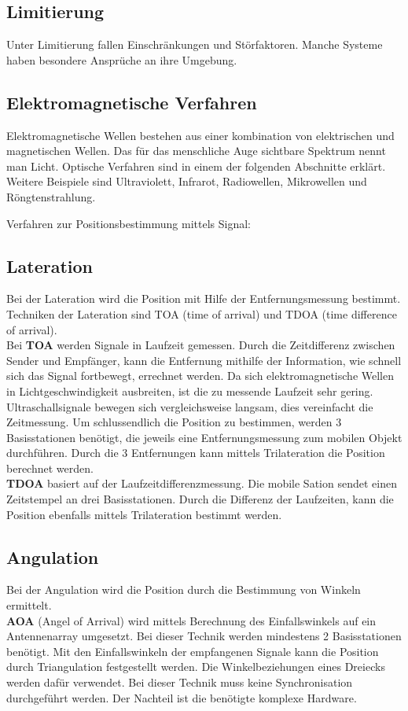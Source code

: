     \subsection*{Limitierung}
    Unter Limitierung fallen Einschränkungen und Störfaktoren. Manche Systeme haben besondere Ansprüche an ihre Umgebung.


    \subsection{Elektromagnetische Verfahren}

    Elektromagnetische Wellen bestehen aus einer kombination von elektrischen und magnetischen Wellen. Das für das menschliche Auge sichtbare Spektrum nennt man Licht. Optische Verfahren sind in einem der folgenden Abschnitte erklärt. Weitere Beispiele sind Ultraviolett, Infrarot, Radiowellen, Mikrowellen und Röngtenstrahlung. 

    Verfahren zur Positionsbestimmung mittels Signal: \cite{pos_signal_2} \cite{pos_signal_4}
    
    \subsection*{Lateration}
    Bei der Lateration wird die Position mit Hilfe der Entfernungsmessung bestimmt.
    Techniken der Lateration sind TOA (time of arrival) und TDOA (time difference of arrival).\\
    Bei \textbf{TOA} werden Signale in Laufzeit gemessen. Durch die Zeitdifferenz zwischen Sender und Empfänger, kann die Entfernung mithilfe der Information, wie schnell sich das Signal fortbewegt, errechnet werden. Da sich elektromagnetische Wellen in Lichtgeschwindigkeit ausbreiten, ist die zu messende Laufzeit sehr gering. Ultraschallsignale bewegen sich vergleichsweise langsam, dies vereinfacht die Zeitmessung. 
    Um schlussendlich die Position zu bestimmen, werden 3 Basisstationen benötigt, die jeweils eine Entfernungsmessung zum mobilen Objekt durchführen. Durch die 3 Entfernungen kann mittels Trilateration die Position berechnet werden.
    \\ %
    \textbf{TDOA} basiert auf der Laufzeitdifferenzmessung. 
    Die mobile Sation sendet einen Zeitstempel an drei Basisstationen. Durch die Differenz der Laufzeiten, kann die Position ebenfalls mittels Trilateration bestimmt werden.
    \\ %
    \subsection*{Angulation}
    Bei der Angulation wird die Position durch die Bestimmung von Winkeln ermittelt. \\
    \textbf{AOA} (Angel of Arrival) wird mittels Berechnung des Einfallswinkels auf ein Antennenarray umgesetzt. Bei dieser Technik werden mindestens 2 Basisstationen benötigt. Mit den Einfallswinkeln der empfangenen Signale kann die Position durch Triangulation festgestellt werden. Die Winkelbeziehungen eines Dreiecks werden dafür verwendet.
    Bei dieser Technik muss keine Synchronisation durchgeführt werden. Der Nachteil ist die benötigte komplexe Hardware. 
    \\ %
